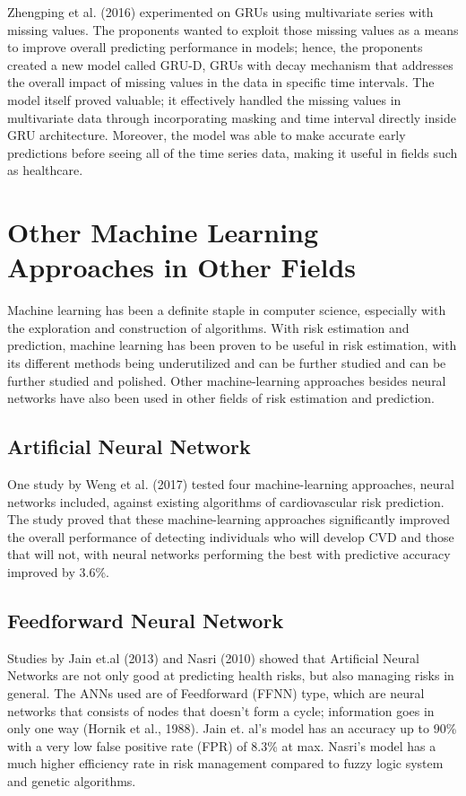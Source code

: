 \documentclass[10pt,11pt,12pt,oneside]{book}
\begin{document}
        Zhengping et al. (2016) experimented on GRUs using multivariate series with missing values. The proponents wanted to exploit those missing values as a means to improve overall predicting performance in models; hence, the proponents created a new model called GRU-D, GRUs with decay mechanism that addresses the overall impact of missing values in the data in specific time intervals. The model itself proved valuable; it effectively handled the missing values in multivariate data through incorporating masking and time interval directly inside GRU architecture. Moreover, the model was able to make accurate early predictions before seeing all of the time series data, making it useful in fields such as healthcare. \cite{DBLP:journals/corr/ChePCSL16}
    \section{Other Machine Learning Approaches in Other Fields}
    Machine learning has been a definite staple in computer science, especially with the exploration and construction of algorithms. With risk estimation and prediction, machine learning has been proven to be useful in risk estimation, with its different methods being underutilized and can be further studied and can be further studied and polished. \cite{Kruppa2012} Other machine-learning approaches besides neural networks have also been used in other fields of risk estimation and prediction. 
        \subsection{Artificial Neural Network}
        One study by Weng et al. (2017) tested four machine-learning approaches, neural networks included, against existing algorithms of cardiovascular risk prediction. The study proved that these machine-learning approaches significantly improved the overall performance of detecting individuals who will develop CVD and those that will not, with neural networks performing the best with predictive accuracy improved by 3.6\%. \cite{Weng2017}

        \subsection{Feedforward Neural Network}
        Studies by Jain et.al (2013) and Nasri (2010) showed that Artificial Neural Networks are not only good at predicting health risks, but also managing risks in general. The ANNs used are of Feedforward (FFNN) type, which are neural networks that consists of nodes that doesn’t form a cycle; information goes in only one way (Hornik et al., 1988). Jain et. al’s model has an accuracy up to 90\% with a very low false positive rate (FPR) of 8.3\% at max. Nasri’s model has a much higher efficiency rate in risk management compared to fuzzy logic system and genetic algorithms. \cite{jain_singh_2013, nasri2010application}
\end{document}
